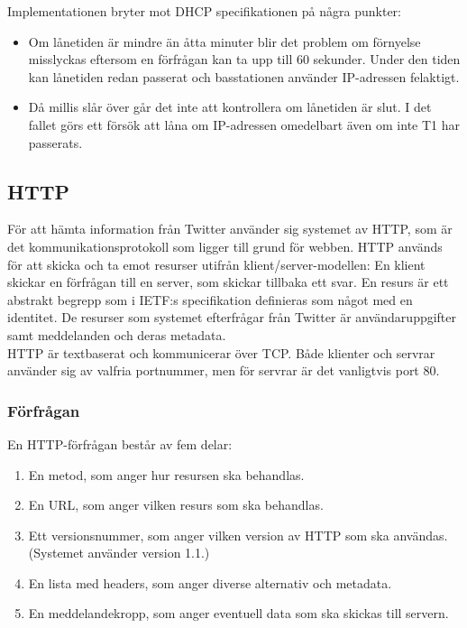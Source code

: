 \documentclass[a4paper,11pt]{article}
\begin{document}
Implementationen bryter mot DHCP specifikationen på några punkter:

	\begin{itemize}
	\item Om lånetiden är mindre än åtta minuter blir det problem om förnyelse misslyckas eftersom en förfrågan kan ta upp till 60 sekunder. Under den tiden kan lånetiden redan passerat och     basstationen använder IP-adressen felaktigt.
    	\item Då millis slår över går det inte att kontrollera om lånetiden är slut. I det fallet görs ett försök att låna om IP-adressen omedelbart även om inte T1 har passerats.
	\end{itemize}	
	
\subsection{HTTP}
För att hämta information från Twitter använder sig systemet av HTTP, som är det kommunikationsprotokoll som ligger till grund för webben. HTTP används för att skicka och ta emot resurser utifrån klient/server-modellen: En klient skickar en förfrågan till en server, som skickar tillbaka ett svar. En resurs är ett abstrakt begrepp som i IETF:s specifikation definieras som något med en identitet. De resurser som systemet efterfrågar från Twitter är användaruppgifter samt meddelanden och deras metadata. \\

HTTP är textbaserat och kommunicerar över TCP. Både klienter och servrar använder sig av valfria portnummer, men för servrar är det vanligtvis port 80.

\subsubsection{Förfrågan}

En HTTP-förfrågan består av fem delar:
	
	\begin{enumerate}
    	\item En metod, som anger hur resursen ska behandlas.
    	\item En URL, som anger vilken resurs som ska behandlas.
    	\item Ett versionsnummer, som anger vilken version av HTTP som ska användas. (Systemet använder version 1.1.)
    	\item En lista med headers, som anger diverse alternativ och metadata.
    	\item En meddelandekropp, som anger eventuell data som ska skickas till servern.
	\end{enumerate}
\end{document}
